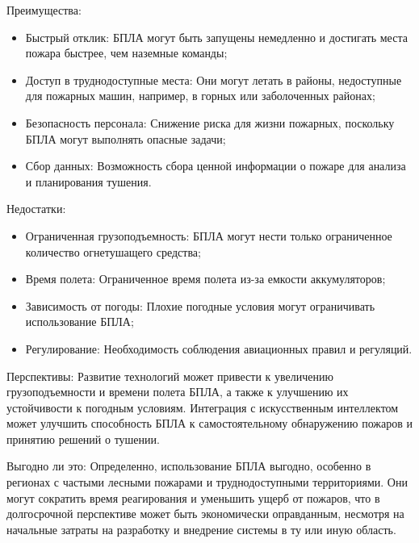 Преимущества:
\begin{itemize}
	\item Быстрый отклик: БПЛА могут быть запущены немедленно и достигать места пожара быстрее, чем наземные команды;
	\item Доступ в труднодоступные места: Они могут летать в районы, недоступные для пожарных машин, например, в горных или заболоченных районах;
	\item Безопасность персонала: Снижение риска для жизни пожарных, поскольку БПЛА могут выполнять опасные задачи;
	\item Сбор данных: Возможность сбора ценной информации о пожаре для анализа и планирования тушения.
\end{itemize}
Недостатки:
\begin{itemize}
	\item Ограниченная грузоподъемность: БПЛА могут нести только ограниченное количество огнетушащего средства;
	\item Время полета: Ограниченное время полета из-за емкости аккумуляторов;
	\item Зависимость от погоды: Плохие погодные условия могут ограничивать использование БПЛА;
	\item Регулирование: Необходимость соблюдения авиационных правил и регуляций.
\end{itemize}

Перспективы:
Развитие технологий может привести к увеличению грузоподъемности и времени полета БПЛА, а также к улучшению их устойчивости к погодным условиям. Интеграция с искусственным интеллектом может улучшить способность БПЛА к самостоятельному обнаружению пожаров и принятию решений о тушении.

Выгодно ли это:
Определенно, использование БПЛА выгодно, особенно в регионах с частыми лесными пожарами и труднодоступными территориями. Они могут сократить время реагирования и уменьшить ущерб от пожаров, что в долгосрочной перспективе может быть экономически оправданным, несмотря на начальные затраты на разработку и внедрение системы в ту или иную область.
